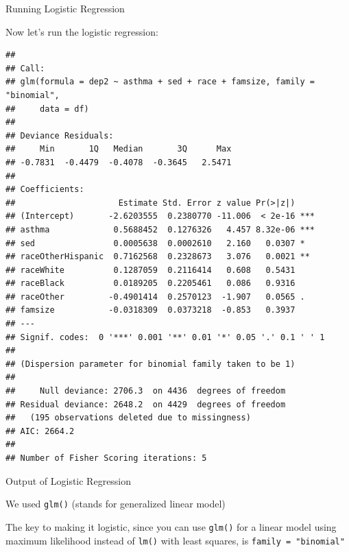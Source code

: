 \begin{frame}[fragile]{Running Logistic Regression}

Now let's run the logistic regression: \small

\begin{Shaded}
\begin{Highlighting}[]
\StringTok{ }\OperatorTok{~}\StringTok{ }\OperatorTok{+}\StringTok{ }\OperatorTok{+}\StringTok{ }\OperatorTok{+}\StringTok{ }
              \NormalTok{)}
\end{Highlighting}
\end{Shaded}

\begin{verbatim}
## 
## Call:
## glm(formula = dep2 ~ asthma + sed + race + famsize, family = "binomial", 
##     data = df)
## 
## Deviance Residuals: 
##     Min       1Q   Median       3Q      Max  
## -0.7831  -0.4479  -0.4078  -0.3645   2.5471  
## 
## Coefficients:
##                     Estimate Std. Error z value Pr(>|z|)    
## (Intercept)       -2.6203555  0.2380770 -11.006  < 2e-16 ***
## asthma             0.5688452  0.1276326   4.457 8.32e-06 ***
## sed                0.0005638  0.0002610   2.160   0.0307 *  
## raceOtherHispanic  0.7162568  0.2328673   3.076   0.0021 ** 
## raceWhite          0.1287059  0.2116414   0.608   0.5431    
## raceBlack          0.0189205  0.2205461   0.086   0.9316    
## raceOther         -0.4901414  0.2570123  -1.907   0.0565 .  
## famsize           -0.0318309  0.0373218  -0.853   0.3937    
## ---
## Signif. codes:  0 '***' 0.001 '**' 0.01 '*' 0.05 '.' 0.1 ' ' 1
## 
## (Dispersion parameter for binomial family taken to be 1)
## 
##     Null deviance: 2706.3  on 4436  degrees of freedom
## Residual deviance: 2648.2  on 4429  degrees of freedom
##   (195 observations deleted due to missingness)
## AIC: 2664.2
## 
## Number of Fisher Scoring iterations: 5
\end{verbatim}

\normalsize

\end{frame}

\begin{frame}[fragile]{Output of Logistic Regression}

We used \texttt{glm()} (stands for generalized linear model)

The key to making it logistic, since you can use \texttt{glm()} for a
linear model using maximum likelihood instead of \texttt{lm()} with
least squares, is \texttt{family\ =\ "binomial"}

\end{frame}

